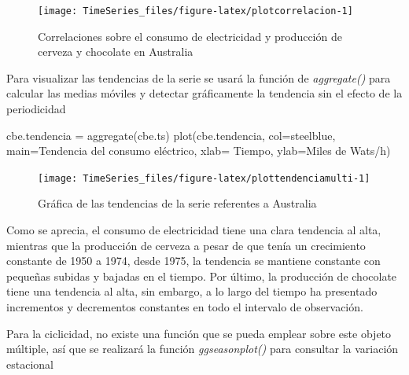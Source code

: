 \documentclass[
  spanish,
]{book}
\newenvironment{Shaded}{\begin{snugshade}}{\end{snugshade}}
\newcommand{\AttributeTok}[1]{\textcolor[rgb]{0.77,0.63,0.00}{#1}}
\newcommand{\FunctionTok}[1]{\textcolor[rgb]{0.00,0.00,0.00}{#1}}
\newcommand{\NormalTok}[1]{#1}
\newcommand{\OtherTok}[1]{\textcolor[rgb]{0.56,0.35,0.01}{#1}}
\newcommand{\StringTok}[1]{\textcolor[rgb]{0.31,0.60,0.02}{#1}}
\theoremstyle{remark}
\begin{document}
\begin{figure}

{\centering \texttt{[image: TimeSeries\_files/figure-latex/plotcorrelacion-1]} 

}

\caption{Correlaciones sobre el consumo de electricidad y producción de cerveza y chocolate en Australia}\label{fig:plotcorrelacion}
\end{figure}

Para visualizar las tendencias de la serie se usará la función de \emph{aggregate()} para calcular las medias móviles y detectar gráficamente la tendencia sin el efecto de la periodicidad

\begin{Shaded}
\begin{Highlighting}[]
\NormalTok{cbe.tendencia }\OtherTok{=} \FunctionTok{aggregate}\NormalTok{(cbe.ts)}
\FunctionTok{plot}\NormalTok{(cbe.tendencia, }\AttributeTok{col=}\StringTok{\textquotesingle{}steelblue\textquotesingle{}}\NormalTok{, }
    \AttributeTok{main=}\StringTok{\textquotesingle{}Tendencia del consumo eléctrico\textquotesingle{}}\NormalTok{,}
    \AttributeTok{xlab=} \StringTok{\textquotesingle{}Tiempo\textquotesingle{}}\NormalTok{,}
    \AttributeTok{ylab=}\StringTok{\textquotesingle{}Miles de Wats/h\textquotesingle{}}\NormalTok{)}
\end{Highlighting}
\end{Shaded}

\begin{figure}

{\centering \texttt{[image: TimeSeries\_files/figure-latex/plottendenciamulti-1]} 

}

\caption{Gráfica de las tendencias de la serie referentes a Australia}\label{fig:plottendenciamulti}
\end{figure}

Como se aprecia, el consumo de electricidad tiene una clara tendencia al alta, mientras que la producción de cerveza a pesar de que tenía un crecimiento constante de 1950 a 1974, desde 1975, la tendencia se mantiene constante con pequeñas subidas y bajadas en el tiempo. Por último, la producción de chocolate tiene una tendencia al alta, sin embargo, a lo largo del tiempo ha presentado incrementos y decrementos constantes en todo el intervalo de observación.

Para la ciclicidad, no existe una función que se pueda emplear sobre este objeto múltiple, así que se realizará la función \emph{ggseasonplot()} para consultar la variación estacional
\end{document}
